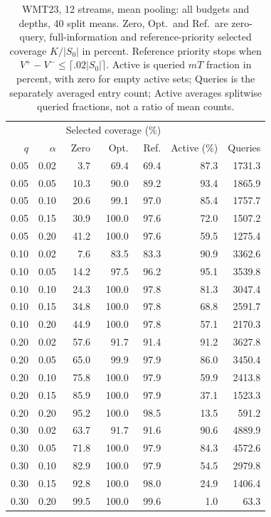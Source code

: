 \begin{table}[t]
\centering\small
\begin{tabular}{rrrrrrr}
\toprule
 & & \multicolumn{3}{c}{Selected coverage (\%)} & & \\
$q$ & $\alpha$ & Zero & Opt. & Ref. & Active (\%) & Queries \\
\midrule
0.05 & 0.02 & 3.7 & 69.4 & 69.4 & 87.3 & 1731.3 \\
0.05 & 0.05 & 10.3 & 90.0 & 89.2 & 93.4 & 1865.9 \\
0.05 & 0.10 & 20.6 & 99.1 & 97.0 & 85.4 & 1757.7 \\
0.05 & 0.15 & 30.9 & 100.0 & 97.6 & 72.0 & 1507.2 \\
0.05 & 0.20 & 41.2 & 100.0 & 97.6 & 59.5 & 1275.4 \\
0.10 & 0.02 & 7.6 & 83.5 & 83.3 & 90.9 & 3362.6 \\
0.10 & 0.05 & 14.2 & 97.5 & 96.2 & 95.1 & 3539.8 \\
0.10 & 0.10 & 24.3 & 100.0 & 97.8 & 81.3 & 3047.4 \\
0.10 & 0.15 & 34.8 & 100.0 & 97.8 & 68.8 & 2591.7 \\
0.10 & 0.20 & 44.9 & 100.0 & 97.8 & 57.1 & 2170.3 \\
0.20 & 0.02 & 57.6 & 91.7 & 91.4 & 91.2 & 3627.8 \\
0.20 & 0.05 & 65.0 & 99.9 & 97.9 & 86.0 & 3450.4 \\
0.20 & 0.10 & 75.8 & 100.0 & 97.9 & 59.9 & 2413.8 \\
0.20 & 0.15 & 85.9 & 100.0 & 97.9 & 37.1 & 1523.3 \\
0.20 & 0.20 & 95.2 & 100.0 & 98.5 & 13.5 & 591.2 \\
0.30 & 0.02 & 63.7 & 91.7 & 91.6 & 90.6 & 4889.9 \\
0.30 & 0.05 & 71.8 & 100.0 & 97.9 & 84.3 & 4572.6 \\
0.30 & 0.10 & 82.9 & 100.0 & 97.9 & 54.5 & 2979.8 \\
0.30 & 0.15 & 92.8 & 100.0 & 98.0 & 24.9 & 1406.4 \\
0.30 & 0.20 & 99.5 & 100.0 & 99.6 & 1.0 & 63.3 \\
\bottomrule
\end{tabular}
\caption{WMT23, 12 streams, mean pooling: all budgets and depths, 40 split means. Zero, Opt.\ and Ref.\ are zero-query, full-information and reference-priority selected coverage $K/|S_0|$ in percent. Reference priority stops when $V^+-V^-\le\lceil.02|S_0|\rceil$. Active is queried $mT$ fraction in percent, with zero for empty active sets; Queries is the separately averaged entry count; Active averages splitwise queried fractions, not a ratio of mean counts.}
\label{tab:review-budget-2-mean}
\end{table}
